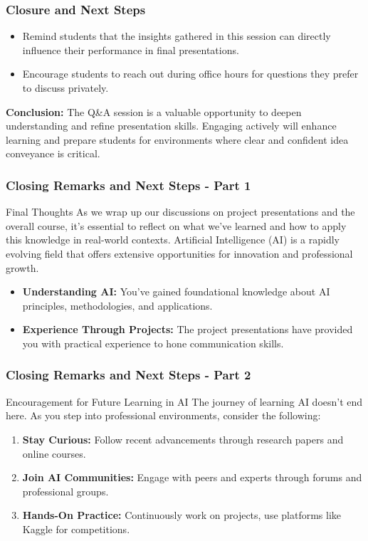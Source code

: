 \documentclass[aspectratio=169]{beamer}
\begin{document}
\begin{frame}[fragile]
    \frametitle{Closure and Next Steps}
    \begin{itemize}
        \item Remind students that the insights gathered in this session can directly influence their performance in final presentations.
        \item Encourage students to reach out during office hours for questions they prefer to discuss privately.
    \end{itemize}
    
    \textbf{Conclusion:} The Q\&A session is a valuable opportunity to deepen understanding and refine presentation skills. Engaging actively will enhance learning and prepare students for environments where clear and confident idea conveyance is critical.
\end{frame}

\begin{frame}[fragile]
    \frametitle{Closing Remarks and Next Steps - Part 1}

    \begin{block}{Final Thoughts}
        As we wrap up our discussions on project presentations and the overall course, it's essential to reflect on what we've learned and how to apply this knowledge in real-world contexts. 
        Artificial Intelligence (AI) is a rapidly evolving field that offers extensive opportunities for innovation and professional growth.
    \end{block}
    
    \begin{itemize}
        \item \textbf{Understanding AI:} You've gained foundational knowledge about AI principles, methodologies, and applications.
        \item \textbf{Experience Through Projects:} The project presentations have provided you with practical experience to hone communication skills.
    \end{itemize}
\end{frame}

\begin{frame}[fragile]
    \frametitle{Closing Remarks and Next Steps - Part 2}

    \begin{block}{Encouragement for Future Learning in AI}
        The journey of learning AI doesn’t end here. As you step into professional environments, consider the following:
    \end{block}
    
    \begin{enumerate}
        \item \textbf{Stay Curious:} Follow recent advancements through research papers and online courses.
        \item \textbf{Join AI Communities:} Engage with peers and experts through forums and professional groups.
        \item \textbf{Hands-On Practice:} Continuously work on projects, use platforms like Kaggle for competitions.
    \end{enumerate}
\end{frame}
\end{document}
